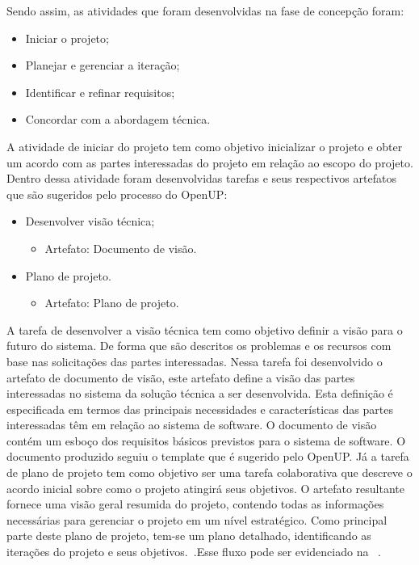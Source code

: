 Sendo assim, as atividades que foram desenvolvidas na fase de concepção foram:
\begin{itemize}
    \item Iniciar o projeto;
    \item Planejar e gerenciar a iteração;
    \item Identificar e refinar requisitos;
    \item Concordar com a abordagem técnica.
\end{itemize}

A atividade de iniciar do projeto tem como objetivo inicializar o projeto e obter um acordo com as partes interessadas do projeto em relação ao escopo do projeto. Dentro dessa atividade foram desenvolvidas tarefas e seus respectivos artefatos que são sugeridos pelo processo do \acrfull{OpenUP}:

\begin{itemize}
    \item Desenvolver visão técnica;
        \begin{itemize}
            \item Artefato: Documento de visão.
        \end{itemize}
    \item Plano de projeto.
    \begin{itemize}
            \item Artefato: Plano de projeto.
        \end{itemize}
\end{itemize}


%

A tarefa de desenvolver a visão técnica tem como objetivo definir a visão para o futuro do sistema. De forma que são descritos os problemas e os recursos com base nas solicitações das partes interessadas. Nessa tarefa foi desenvolvido o artefato de documento de visão, este artefato define a visão das partes interessadas no sistema da solução técnica a ser desenvolvida. Esta definição é especificada em termos das principais necessidades e características das partes interessadas têm em relação ao sistema de software. O documento de visão contém um esboço dos requisitos básicos previstos para o sistema de software. O documento produzido seguiu o template que é sugerido pelo \acrfull{OpenUP}.
Já a tarefa de plano de projeto tem como objetivo ser uma tarefa colaborativa que descreve o acordo inicial sobre como o projeto atingirá seus objetivos. O artefato resultante  fornece uma visão geral resumida do projeto, contendo todas as informações necessárias para gerenciar o projeto em um nível estratégico. Como principal parte deste plano de projeto, tem-se um plano detalhado, identificando as iterações do projeto e seus objetivos.~\cite{openup}.Esse fluxo pode ser evidenciado na ~.

